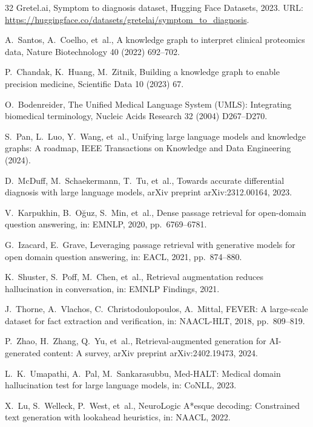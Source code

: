 \documentclass[preprint,12pt]{elsarticle}
\begin{document}
\begin{thebibliography}{32}
Gretel.ai, Symptom to diagnosis dataset, Hugging Face Datasets, 2023. URL: \url{https://huggingface.co/datasets/gretelai/symptom_to_diagnosis}.

A.~Santos, A.~Coelho, et~al., A knowledge graph to interpret clinical proteomics data, Nature Biotechnology 40 (2022) 692--702.

P.~Chandak, K.~Huang, M.~Zitnik, Building a knowledge graph to enable precision medicine, Scientific Data 10 (2023) 67.

O.~Bodenreider, The Unified Medical Language System (UMLS): Integrating biomedical terminology, Nucleic Acids Research 32 (2004) D267--D270.

S.~Pan, L.~Luo, Y.~Wang, et~al., Unifying large language models and knowledge graphs: A roadmap, IEEE Transactions on Knowledge and Data Engineering (2024).

D.~McDuff, M.~Schaekermann, T.~Tu, et~al., Towards accurate differential diagnosis with large language models, arXiv preprint arXiv:2312.00164, 2023.

V.~Karpukhin, B.~O\u{g}uz, S.~Min, et~al., Dense passage retrieval for open-domain question answering, in: EMNLP, 2020, pp.~6769--6781.

G.~Izacard, E.~Grave, Leveraging passage retrieval with generative models for open domain question answering, in: EACL, 2021, pp.~874--880.

K.~Shuster, S.~Poff, M.~Chen, et~al., Retrieval augmentation reduces hallucination in conversation, in: EMNLP Findings, 2021.

J.~Thorne, A.~Vlachos, C.~Christodoulopoulos, A.~Mittal, FEVER: A large-scale dataset for fact extraction and verification, in: NAACL-HLT, 2018, pp.~809--819.

P.~Zhao, H.~Zhang, Q.~Yu, et~al., Retrieval-augmented generation for AI-generated content: A survey, arXiv preprint arXiv:2402.19473, 2024.

L.~K.~Umapathi, A.~Pal, M.~Sankarasubbu, Med-HALT: Medical domain hallucination test for large language models, in: CoNLL, 2023.

X.~Lu, S.~Welleck, P.~West, et~al., NeuroLogic A*esque decoding: Constrained text generation with lookahead heuristics, in: NAACL, 2022.


\end{thebibliography}
\end{document}

